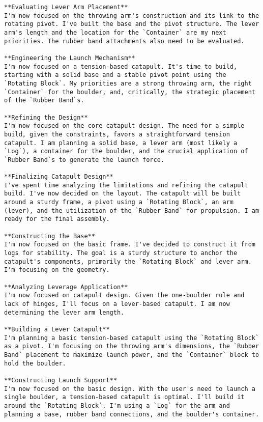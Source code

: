 \begin{lstlisting}
**Evaluating Lever Arm Placement**
I'm now focused on the throwing arm's construction and its link to the rotating pivot. I've built the base and the pivot structure. The lever arm's length and the location for the `Container` are my next priorities. The rubber band attachments also need to be evaluated.

**Engineering the Launch Mechanism**
I'm now focused on a tension-based catapult. It's time to build, starting with a solid base and a stable pivot point using the `Rotating Block`. My priorities are a strong throwing arm, the right `Container` for the boulder, and, critically, the strategic placement of the `Rubber Band`s.

**Refining the Design**
I'm now focused on the core catapult design. The need for a simple build, given the constraints, favors a straightforward tension catapult. I am planning a solid base, a lever arm (most likely a `Log`), a container for the boulder, and the crucial application of `Rubber Band`s to generate the launch force.

**Finalizing Catapult Design**
I've spent time analyzing the limitations and refining the catapult build. I've now decided on the layout. The catapult will be built around a sturdy frame, a pivot using a `Rotating Block`, an arm (lever), and the utilization of the `Rubber Band` for propulsion. I am ready for the final assembly.

**Constructing the Base**
I'm now focused on the basic frame. I've decided to construct it from logs for stability. The goal is a sturdy structure to anchor the catapult's components, primarily the `Rotating Block` and lever arm. I'm focusing on the geometry.

**Analyzing Leverage Application**
I'm now focused on catapult design. Given the one-boulder rule and lack of hinges, I'll focus on a lever-based catapult. I am now determining the lever arm length.

**Building a Lever Catapult**
I'm planning a basic tension-based catapult using the `Rotating Block` as a pivot. I'm focusing on the throwing arm's dimensions, the `Rubber Band` placement to maximize launch power, and the `Container` block to hold the boulder.

**Constructing Launch Support**
I'm now focused on the basic design. With the user's need to launch a single boulder, a tension-based catapult is optimal. I'll build it around the `Rotating Block`. I'm using a `Log` for the arm and planning a base, rubber band connections, and the boulder's container.


\end{lstlisting}
